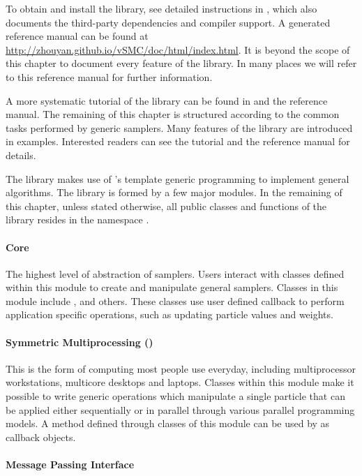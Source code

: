 To obtain and install the library, see detailed instructions in
\cite{vsmcjss}, which also documents the third-party dependencies and compiler
support. A \doxygen \cite{doxygen} generated reference manual can be found at
\url{http://zhouyan.github.io/vSMC/doc/html/index.html}. It is beyond the
scope of this chapter to document every feature of the \vsmc library. In many
places we will refer to this reference manual for further information.

A more systematic tutorial of the library can be found in \cite{vsmcjss} and
the reference manual. The remaining of this chapter is structured according to
the common tasks performed by generic \smc samplers. Many features of the
library are introduced in examples. Interested readers can see the tutorial
\cite{vsmcjss} and the reference manual for details.

The \vsmc library makes use of \cpp's template generic programming to
implement general \smc algorithms. The library is formed by a few major
modules. In the remaining of this chapter, unless stated otherwise, all public
classes and functions of the library resides in the namespace
.

\paragraph{Core}

The highest level of abstraction of \smc samplers. Users interact with classes
defined within this module to create and manipulate general \smc samplers.
Classes in this module include ,  and
others. These classes use user defined callback to perform application
specific operations, such as updating particle values and weights.

\paragraph{Symmetric Multiprocessing (\smp)}

This is the form of computing most people use everyday, including
multiprocessor workstations, multicore desktops and laptops. Classes within
this module make it possible to write generic operations which manipulate a
single particle that can be applied either sequentially or in parallel through
various parallel programming models. A method defined through classes of this
module can be used by  as callback objects.

\paragraph{Message Passing Interface}

